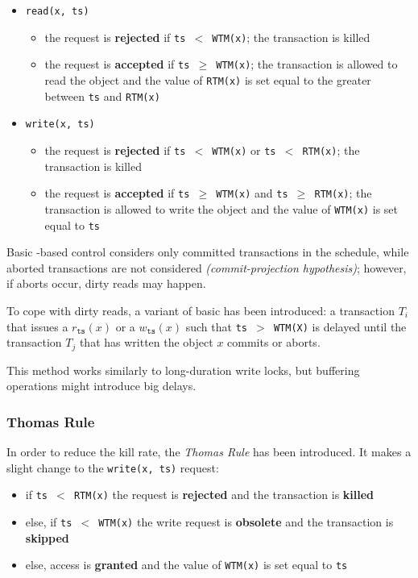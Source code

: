 \documentclass[english]{article}
\begin{document}
\begin{itemize}
  \item \texttt{read(x, ts)}
        \begin{itemize}
          \item[\xmarkthin] the request is \textbf{rejected} if \texttt{ts \(<\) WTM(x)}; the transaction is killed
          \item[\cmarkthin] the request is \textbf{accepted} if \texttt{ts \(\geq\) WTM(x)}; the transaction is allowed to read the object and the value of \texttt{RTM(x)} is set equal to the greater between \texttt{ts} and \texttt{RTM(x)}
        \end{itemize}
  \item \texttt{write(x, ts)}
        \begin{itemize}
          \item[\xmarkthin] the request is \textbf{rejected} if \texttt{ts \(<\) WTM(x)} or \texttt{ts \(<\) RTM(x)}; the transaction is killed
          \item[\cmarkthin] the request is \textbf{accepted} if \texttt{ts \(\geq\) WTM(x)} and \texttt{ts \(\geq\) RTM(x)}; the transaction is allowed to write the object and the value of \texttt{WTM(x)} is set equal to \texttt{ts}
        \end{itemize}
\end{itemize}

\bigskip
Basic \ts-based control considers only committed transactions in the schedule, while aborted transactions are not considered \textit{(commit-projection hypothesis)};
however, if aborts occur, dirty reads may happen.

To cope with dirty reads, a variant of basic \ts has been introduced: a transaction \(T_i\) that issues a \(r_{\texttt{ts}}(x)\) or a \(w_{\texttt{ts}}(x)\) such that \texttt{ts \(>\) WTM(X)} is delayed until the transaction \(T_j\) that has written the object \(x\) commits or aborts.

This method works similarly to long-duration write locks, but buffering operations might introduce big delays.

\subsubsection{Thomas Rule}

In order to reduce the kill rate, the \textit{Thomas Rule} has been introduced.
It makes a slight change to the \texttt{write(x, ts)} request:

\begin{itemize}
  \item if \texttt{ts \(<\) RTM(x)} the request is \textbf{rejected} and the transaction is \textbf{killed}
  \item else, if \texttt{ts \(<\) WTM(x)} the write request is \textbf{obsolete} and the transaction is \textbf{skipped}
  \item else, access is \textbf{granted} and the value of \texttt{WTM(x)} is set equal to \texttt{ts}
\end{itemize}
\end{document}
